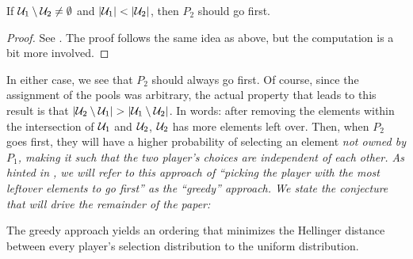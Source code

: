 \begin{proposition}\label{prop:two-player-second-case}
    If $\mathcal{U}_1 \setminus \mathcal{U}_2 \neq \emptyset$ and $|\mathcal{U}_1| < |\mathcal{U}_2|$, then $P_2$ should go first.
\end{proposition}
\begin{proof}
    See . The proof follows the same idea as above, but the computation is a bit more involved.
\end{proof}

In either case, we see that $P_2$ should always go first.
Of course, since the assignment of the pools was arbitrary, the actual property that leads to this result is that $|\mathcal{U}_2 \setminus \mathcal{U}_1| > |\mathcal{U}_1 \setminus \mathcal{U}_2|$.
In words: after removing the elements within the intersection of $\mathcal{U}_1$ and $\mathcal{U}_2$, $\mathcal{U}_2$ has more elements left over.
Then, when $P_2$ goes first, they will have a higher probability of selecting an element \it{not} owned by $P_1$, making it such that the two player's choices are independent of each other.
As hinted in , we will refer to this approach of ``picking the player with the most leftover elements to go first'' as the ``greedy'' approach.
We state the conjecture that will drive the remainder of the paper:
\begin{conjecture}
    The greedy approach yields an ordering that minimizes the Hellinger distance between every player's selection distribution to the uniform distribution.
\end{conjecture}